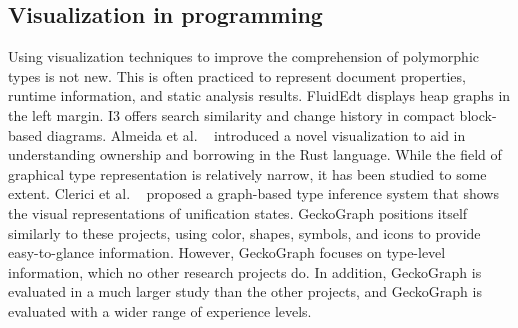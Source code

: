 

\subsection{Visualization in programming}
Using visualization techniques to improve the comprehension of polymorphic types is not new. This is often practiced to represent document properties, runtime information, and static analysis results.  FluidEdt \cite{Ou2015-vr} displays heap graphs in the left margin. I3 \cite{Beck2015-my} offers search similarity and change history in compact block-based diagrams. Almeida et al. ~\cite{Almeida2022-bv} introduced a novel visualization to aid in understanding ownership and borrowing in the Rust language. While the field of graphical type representation is relatively narrow, it has been studied to some extent. Clerici et al. ~\cite{Clerici2013-ru} proposed a graph-based type inference system that shows the visual representations of unification states. GeckoGraph positions itself similarly to these projects, using color, shapes, symbols, and icons to provide easy-to-glance information. However, GeckoGraph focuses on type-level information, which no other research projects do. In addition, GeckoGraph is evaluated in a much larger study than the other projects, and GeckoGraph is evaluated with a wider range of experience levels. 

